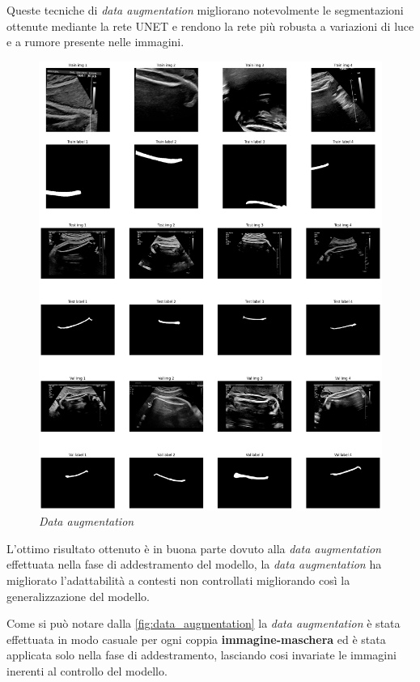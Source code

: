 Queste tecniche di \textit{data augmentation} migliorano notevolmente le segmentazioni ottenute mediante la rete UNET e rendono la rete più robusta a variazioni di luce e a rumore presente nelle immagini.


\begin{figure}[!ht]
	\begin{adjustbox}{width=0.95\columnwidth, center}
		\includegraphics{./images/data_augmentation.png}
	\end{adjustbox}
  \caption{\textit{Data augmentation}}
  \label{fig:data_augmentation}
\end{figure}

L'ottimo risultato ottenuto è in buona parte dovuto alla \textit{data augmentation} effettuata nella fase di addestramento del modello, la \textit{data augmentation} ha migliorato l'adattabilità a contesti non controllati migliorando così la generalizzazione del modello.


Come si può notare dalla \autoref{fig:data_augmentation} la \textit{data augmentation} è stata effettuata in modo casuale per ogni coppia \textbf{immagine-maschera} ed è stata applicata solo nella fase di addestramento, lasciando cosi invariate le immagini inerenti al controllo del modello.





